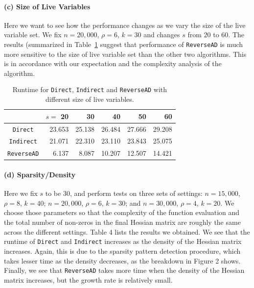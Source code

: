 \documentclass[11pt, a4paper, english]{article}
\begin{document}
\paragraph{(c) Size of Live Variables} 
Here we want to see how the performance changes as we vary the size of the live variable set.
We fix $n = 20,000$, $\rho = 6$, $k = 30$ and changes $s$ from $20$ to $60$. The results (summarized in Table~\ref{tab:live} suggest that performance of {\tt ReverseAD} is much more sensitive to the size of live variable set than the other two algorithms. This is in accordance with our expectation and the complexity analysis of the algorithm.
\begin{table}[htbp]
\begin{center}
\begin{tabular}{ | c | r | r | r | r | r |}
\hline
& $s=$ 20 & 30 & 40 & 50 & 60 \\
\hline
{\tt Direct} & 23.653 & 25.138 & 26.484 & 27.666 & 29.208\\
{\tt Indirect} & 21.071 & 22.310 & 23.110 & 23.843 & 25.075\\
{\tt ReverseAD} & 6.137 & 8.087 & 10.207 & 12.507 & 14.421\\
\hline 
\end{tabular}
\caption{Runtime for {\tt Direct}, {\tt Indirect} and {\tt ReverseAD} with different size of live variables.}
\label{tab:live}
\end{center}
\end{table}

\paragraph{(d) Sparsity/Density} 
Here we fix $s$ to be  $30$, and perform tests on three sets of settings: $n=15,000$, $\rho = 8$, $k=40$; $n=20,000$, $\rho=6$, $k=30$; and $n=30,000$, $\rho=4$, $k=20$. 
We choose those parameters so that the complexity of the function evaluation and the total number of non-zeros in the final Hessian matrix are roughly the same across the different settings. 
Table 4 lists the results we obtained.
We see that the runtime of {\tt Direct} and {\tt Indirect} increases as the density of the Hessian matrix increases. 
Again, this is due to the sparsity pattern detection procedure, which takes lesser time as the density decreases, as the breakdown in Figure 2 shows.
Finally, we see that {\tt ReverseAD} takes more time when the density of the Hessian matrix increases, but the growth rate is relatively small.
\end{document}
